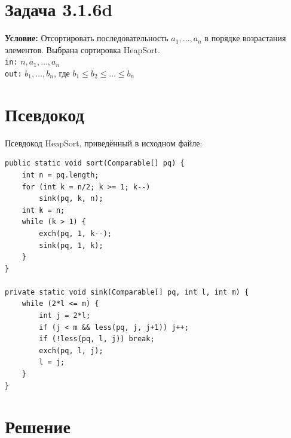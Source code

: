 \documentclass[12pt]{article}
\begin{document}
\tableofcontents

\section{Задача 3.1.6d}

\textbf{Условие:} Отсортировать последовательность $a_1,\ldots,a_n$ в порядке возрастания элементов. Выбрана сортировка HeapSort.
\\
\texttt{in:} $n,a_1,\ldots,a_n$\\
\texttt{out:} $b_1,\ldots,b_n$, где $b_1\leq b_2\leq\ldots\leq b_n$

\section{Псевдокод}

Псевдокод HeapSort, приведённый в исходном файле:
\begin{verbatim}
public static void sort(Comparable[] pq) {
    int n = pq.length;
    for (int k = n/2; k >= 1; k--)
        sink(pq, k, n);
    int k = n;
    while (k > 1) {
        exch(pq, 1, k--);
        sink(pq, 1, k);
    }
}

private static void sink(Comparable[] pq, int l, int m) {
    while (2*l <= m) {
        int j = 2*l;
        if (j < m && less(pq, j, j+1)) j++;
        if (!less(pq, l, j)) break;
        exch(pq, l, j);
        l = j;
    }
}
\end{verbatim}

\section{Решение}
\end{document}
